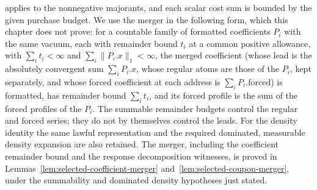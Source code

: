 applies to the nonnegative majorants, and each scalar cost sum is bounded by
the given purchase budget. We use the merger in the following form, which
this chapter does not prove: for a countable family of formatted coefficients
$P_i$ with the same vacuum, each with remainder bound $t_i$ at a common
positive allowance, with $\sum_it_i<\infty$ and
$\sum_i\|P_i.x\|_1<\infty$, the merged coefficient (whose lead is the
absolutely convergent sum $\sum_iP_i.x$, whose regular atoms are those of
the $P_i$, kept separately, and whose forced coefficient at each address is
$\sum_iP_i.\mathrm{forced}$) is formatted, has remainder bound $\sum_it_i$,
and its forced profile is the sum of the forced profiles of the $P_i$.
The summable remainder budgets control the regular and forced series; they
do not by themselves control the leads. For the density identity the same
lawful representation and the required dominated, measurable density
expansion are also retained. The merger, including the coefficient remainder bound and the response decomposition
witnesses, is proved in Lemmas~\ref{lem:selected-coefficient-merger}
and~\ref{lem:selected-coupon-merger}, under the summability and dominated
density hypotheses just stated.

